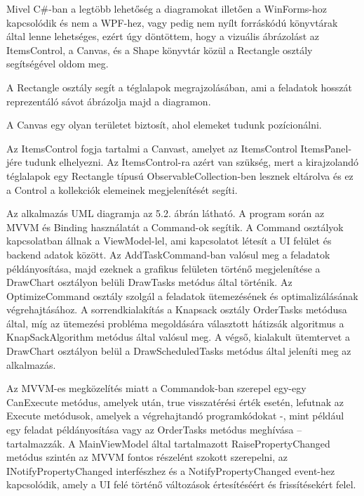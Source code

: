 
Mivel C\#-ban a legtöbb lehetőség a diagramokat illetően a WinForms-hoz kapcsolódik és nem a WPF-hez, vagy pedig nem nyílt forráskódú könyvtárak által lenne lehetséges, ezért úgy döntöttem, hogy a vizuális ábrázolást az ItemsControl, a Canvas, és a Shape könyvtár közül a Rectangle osztály segítségével oldom meg.

A Rectangle osztály segít a téglalapok megrajzolásában, ami a feladatok hosszát reprezentáló sávot ábrázolja majd a diagramon.

A Canvas egy olyan területet biztosít, ahol elemeket tudunk pozícionálni.

Az ItemsControl fogja tartalmi a Canvast, amelyet az ItemsControl ItemsPanel-jére tudunk elhelyezni. Az ItemsControl-ra azért van szükség, mert a kirajzolandó téglalapok egy Rectangle típusú ObservableCollection-ben lesznek eltárolva és ez a Control a kollekciók elemeinek megjelenítését segíti.


Az alkalmazás UML diagramja az 5.2. ábrán látható. A program során az MVVM és Binding használatát a Command-ok segítik. A Command osztályok kapcsolatban állnak a ViewModel-lel, ami kapcsolatot létesít a UI felület és backend adatok között. Az AddTaskCommand-ban valósul meg a feladatok példányosítása, majd ezeknek a grafikus felületen történő megjelenítése a DrawChart osztályon belüli DrawTasks metódus által történik. Az OptimizeCommand osztály szolgál a feladatok ütemezésének és optimalizálásának végrehajtásához. A sorrendkialakítás a Knapsack osztály OrderTasks metódusa által, míg az ütemezési probléma megoldására választott hátizsák algoritmus a KnapSackAlgorithm metódus által valósul meg. A végső, kialakult ütemtervet a DrawChart osztályon belül a DrawScheduledTasks metódus által jeleníti meg az alkalmazás.

Az MVVM-es megközelítés miatt a Commandok-ban szerepel egy-egy CanExecute metódus, amelyek után, true visszatérési érték esetén, lefutnak az Execute metódusok, amelyek a végrehajtandó programkódokat -, mint például egy feladat példányosítása vagy az OrderTasks metódus meghívása – tartalmazzák. A MainViewModel által tartalmazott RaisePropertyChanged metódus szintén az MVVM fontos részelént szokott szerepelni, az INotifyPropertyChanged interfészhez és a NotifyPropertyChanged event-hez kapcsolódik, amely a UI felé történő változások értesítéséért és frissítésekért felel.



